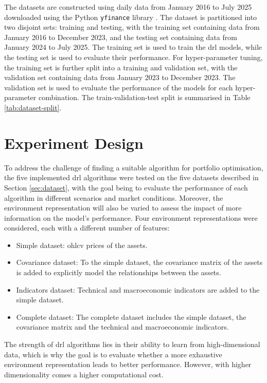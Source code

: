 The datasets are constructed using daily data from January 2016 to July 2025 downloaded using the Python \texttt{yfinance} library \cite{yfinance}. The dataset is partitioned into two disjoint sets: training and testing, with the training set containing data from January 2016 to December 2023, and the testing set containing data from January 2024 to July 2025. The training set is used to train the \acrshort{drl} models, while the testing set is used to evaluate their performance. For hyper-parameter tuning, the training set is further split into a training and validation set, with the validation set containing data from January 2023 to December 2023. The validation set is used to evaluate the performance of the models for each hyper-parameter combination. The train-validation-test split is summarised in Table \ref{tab:dataset-split}.



\section{Experiment Design} \label{sec:experiment-design}

To address the challenge of finding a suitable algorithm for portfolio optimisation, the five implemented \acrshort{drl} algorithms were tested on the five datasets described in Section \ref{sec:dataset}, with the goal being to evaluate the performance of each algorithm in different scenarios and market conditions. Moreover, the environment representation will also be varied to assess the impact of more information on the model's performance. Four environment representations were considered, each with a different number of features:
\begin{itemize}
    \item Simple dataset: \acrfull{ohlcv} prices of the assets.
    \item Covariance dataset: To the simple dataset, the covariance matrix of the assets is added to explicitly model the relationships between the assets.
    \item Indicators dataset: Technical and macroeconomic indicators are added to the simple dataset.
    \item Complete dataset: The complete dataset includes the simple dataset, the covariance matrix and the technical and macroeconomic indicators.
\end{itemize}

The strength of \acrshort{drl} algorithms lies in their ability to learn from high-dimensional data, which is why the goal is to evaluate whether a more exhaustive environment representation leads to better performance. However, with higher dimensionality comes a higher computational cost.

